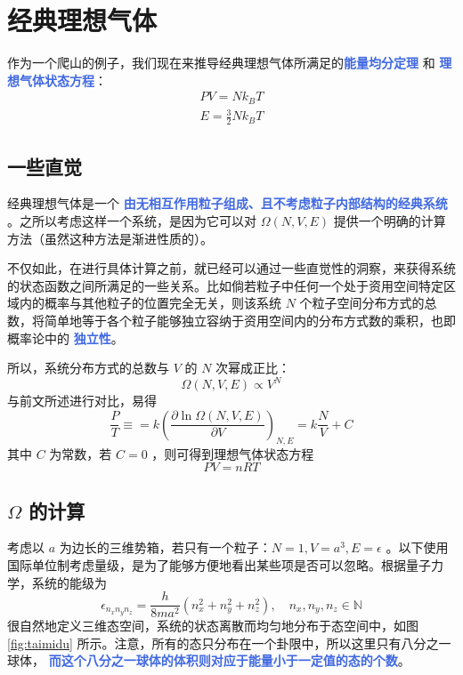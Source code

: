 \documentclass[hyperref,UTF-8]{ctexbook}
\newcommand{\0}{\boldsymbol{0}}
\begin{document}
\section{经典理想气体}\label{sec:经典理想气体}

作为一个爬山的例子，我们现在来推导经典理想气体所满足的\textcolor{RoyalBlue}{\textbf{\kaishu 能量均分定理}} 和 \textcolor{RoyalBlue}{\textbf{\kaishu 理想气体状态方程}}：
\begin{align*}
    PV = Nk_BT \\
    E = \frac{3}{2}N k_B T
\end{align*}

\subsection{一些直觉}\label{intuition}

经典理想气体是一个 \textcolor{RoyalBlue}{\textbf{\kaishu 由无相互作用粒子组成、且不考虑粒子内部结构的经典系统}} 。之所以考虑这样一个系统，是因为它可以对 $\Omega(N,V,E)$ 提供一个明确的计算方法（虽然这种方法是渐进性质的）。 

不仅如此，在进行具体计算之前，就已经可以通过一些直觉性的洞察，来获得系统的状态函数之间所满足的一些关系。比如倘若粒子中任何一个处于资用空间特定区域内的概率与其他粒子的位置完全无关，则该系统  $N$ 个粒子空间分布方式的总数，将简单地等于各个粒子能够独立容纳于资用空间内的分布方式数的乘积，也即概率论中的 \textcolor{RoyalBlue}{\textbf{\kaishu 独立性}}。

所以，系统分布方式的总数与 $V$ 的 $N$ 次幂成正比：
\begin{equation}
    \Omega(N,V,E) \propto V^N
\end{equation}
与前文所述进行对比，易得
\begin{equation}
    \frac{P}{T} \equiv = k \left(\frac{\partial \ln\Omega(N,V,E)}{\partial V}\right)_{N,E} = k\frac{N}{V} + C
\end{equation}
其中 $C$ 为常数，若 $C= 0$ ，则可得到理想气体状态方程
\begin{equation}
    PV = nRT
\end{equation}

\subsection{$\Omega$ 的计算}

考虑以 $a$ 为边长的三维势箱，若只有一个粒子：$N =1,V = a^3, E = \epsilon$ 。以下使用国际单位制考虑量级，是为了能够方便地看出某些项是否可以忽略。根据量子力学，系统的能级为
\begin{equation}
    \epsilon_{n_xn_yn_z} = \frac{h}{8ma^2} (n_x^2 + n_y^2 + n_z^2), \quad n_x, n_y, n_z\in \mathbb{N}
\end{equation}
很自然地定义三维态空间，系统的状态离散而均匀地分布于态空间中，如图 \ref{fig:taimidu} 所示。注意，所有的态只分布在一个卦限中，所以这里只有八分之一球体， \textcolor{RoyalBlue}{\textbf{\kaishu  而这个八分之一球体的体积则对应于能量小于一定值的态的个数}}。
\end{document}
